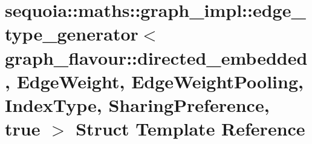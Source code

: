 \hypertarget{structsequoia_1_1maths_1_1graph__impl_1_1edge__type__generator_3_01graph__flavour_1_1directed__ea342cc8fe32300e214551ee23d8584b1}{}\section{sequoia\+::maths\+::graph\+\_\+impl\+::edge\+\_\+type\+\_\+generator$<$ graph\+\_\+flavour\+::directed\+\_\+embedded, Edge\+Weight, Edge\+Weight\+Pooling, Index\+Type, Sharing\+Preference, true $>$ Struct Template Reference}
\label{structsequoia_1_1maths_1_1graph__impl_1_1edge__type__generator_3_01graph__flavour_1_1directed__ea342cc8fe32300e214551ee23d8584b1}
